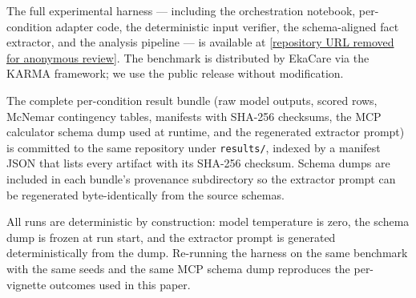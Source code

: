 The full experimental harness --- including the orchestration notebook,
per-condition adapter code, the deterministic input verifier, the schema-aligned
fact extractor, and the analysis pipeline --- is available at
\url{[repository URL removed for anonymous review]}.
The  benchmark is distributed by
EkaCare via the KARMA framework; we use the public release without
modification.

The complete per-condition result bundle (raw model outputs, scored rows,
McNemar contingency tables, manifests with SHA-256 checksums, the MCP
calculator schema dump used at runtime, and the regenerated extractor
prompt) is committed to the same repository under \texttt{results/},
indexed by a manifest JSON that lists every artifact with its SHA-256
checksum. Schema dumps are included in each bundle's provenance
subdirectory so the extractor prompt can be regenerated byte-identically
from the source schemas.

All runs are deterministic by construction: model temperature is zero,
the schema dump is frozen at run start, and the extractor prompt is
generated deterministically from the dump. Re-running the harness on the
same benchmark with the same seeds and the same MCP schema dump
reproduces the per-vignette outcomes used in this paper.
